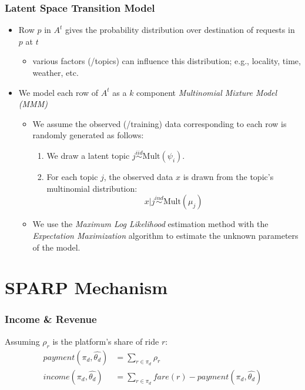 \documentclass[t]{beamer}
\begin{document}
\begin{frame}\frametitle{Latent Space Transition Model}
\begin{itemize}
\item Row $p$ in $A^t$ gives the probability distribution over destination of requests in $p$ at $t$
\begin{itemize}
\item various factors (/topics) can influence this distribution; e.g., locality, time, weather, etc.
\end{itemize}
\item<2-> We model each row of $A^t$ as a $k$ component \textit{Multinomial Mixture Model (MMM)}
\begin{itemize}
\item<3-> We assume the observed (/training) data corresponding to each row is randomly generated as follows:
\begin{enumerate}
\item We draw a latent topic $j \stackrel{iid}{\sim} \textrm{Mult}(\psi_i)$.
\item For each topic $j$, the observed data $x$ is drawn from the topic's multinomial distribution:
\begin{equation*}
x \vert j \stackrel{ind}{\sim} \textrm{Mult}(\mu_j)
\end{equation*}
\end{enumerate}
\item<6-> We use the \textit{Maximum Log Likelihood} estimation method with the \textit{Expectation Maximization} algorithm to estimate the unknown parameters of the model.
\end{itemize}
\end{itemize}
\end{frame}

\section{SPARP Mechanism}

\begin{frame}\frametitle{Income \& Revenue}
Assuming $\rho_r$ is the platform's share of ride $r$:
\begin{align*}
payment(\pi_d, \hat{\theta_d}) &= \sum_{r \in \pi_d} \rho_r\\
income(\pi_d, \hat{\theta_d}) &= \sum_{r \in \pi_d} fare(r) - payment(\pi_d, \hat{\theta_d})
\end{align*}
\vspace{0.2in}
\end{frame}
\end{document}
